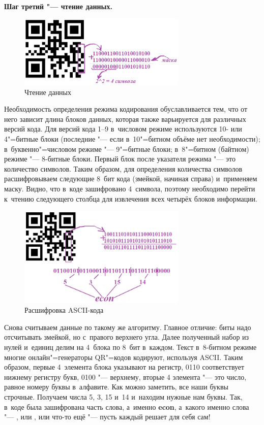 \documentclass[final,pdftex]{../../template/epsilonj}
\begin{document}
\textbf{Шаг третий "--- чтение данных.}
\begin{figure}[hbt]
	\includegraphics[width=80mm]{31.png}
	\caption{Чтение данных}
\end{figure}

Необходимость определения режима кодирования обуславливается тем, что от него зависит длина блоков данных, которая также варьируется для различных версий кода. Для версий кода 1--9 в~числовом режиме используются 10- или 4"=битные блоки (последние "--- если в~10"=битном объёме нет необходимости); в~буквенно"=числовом режиме "--- 9"=битные блоки; в~8"=битном (байтном) режиме "--- 8-битные блоки. Первый блок после указателя режима "--- это количество символов. Таким образом, для определения количества символов расшифровываем следующие 8~бит кода (змейкой, начиная справа) и~применяем маску. Видно, что в~коде зашифровано 4~символа, поэтому необходимо перейти к~чтению следующего столбца для извлечения всех четырёх блоков информации.

\begin{figure}[htbp]
	\includegraphics[width=80mm]{41.png}
	\caption{Расшифровка ASCII-кода}
\end{figure}

Снова считываем данные по такому же алгоритму. Главное отличие: биты надо отсчитывать змейкой, но с~правого верхнего угла. Далее полученный набор из нулей и~единиц делим на 4~блока по 8~бит в~каждом. Текст в~8-битном режиме многие онлайн"=генераторы QR"=кодов кодируют, используя ASCII. Таким образом, первые 4~элемента блока указывают на регистр, 0110 соответствует нижнему регистру букв, 0100 "--- верхнему, вторые 4 элемента "--- это число, равное номеру буквы в~алфавите. Как можно заметить, все наши буквы строчные. Получаем числа 5, 3, 15 и~14 и~находим нужные нам буквы. Так, в~коде была зашифрована часть слова, а~именно \textbf{econ}, а~какого именно слова "--- , или , или что-то ещё "--- пусть каждый решает для себя сам!
\end{document}
